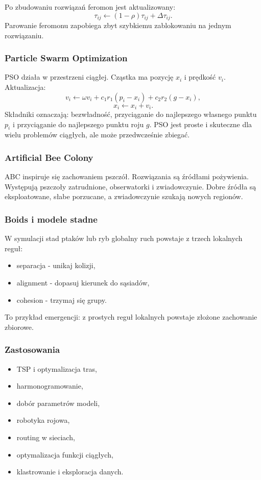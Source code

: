 Po zbudowaniu rozwiązań feromon jest aktualizowany:
\[
\tau_{ij}\leftarrow (1-\rho)\tau_{ij}+\Delta\tau_{ij}.
\]
Parowanie feromonu zapobiega zbyt szybkiemu zablokowaniu na jednym rozwiązaniu.

\subsubsection{Particle Swarm Optimization}

PSO działa w przestrzeni ciągłej. Cząstka ma pozycję $x_i$ i prędkość $v_i$. Aktualizacja:
\[
v_i\leftarrow \omega v_i+c_1r_1(p_i-x_i)+c_2r_2(g-x_i),
\]
\[
x_i\leftarrow x_i+v_i.
\]
Składniki oznaczają: bezwładność, przyciąganie do najlepszego własnego punktu $p_i$ i przyciąganie do najlepszego punktu roju $g$. PSO jest proste i skuteczne dla wielu problemów ciągłych, ale może przedwcześnie zbiegać.

\subsubsection{Artificial Bee Colony}

ABC inspiruje się zachowaniem pszczół. Rozwiązania są źródłami pożywienia. Występują pszczoły zatrudnione, obserwatorki i zwiadowczynie. Dobre źródła są eksploatowane, słabe porzucane, a zwiadowczynie szukają nowych regionów.

\subsubsection{Boids i modele stadne}

W symulacji stad ptaków lub ryb globalny ruch powstaje z trzech lokalnych reguł:
\begin{itemize}
  \item separacja - unikaj kolizji,
  \item alignment - dopasuj kierunek do sąsiadów,
  \item cohesion - trzymaj się grupy.
\end{itemize}
To przykład emergencji: z prostych reguł lokalnych powstaje złożone zachowanie zbiorowe.

\subsubsection{Zastosowania}

\begin{itemize}
  \item TSP i optymalizacja tras,
  \item harmonogramowanie,
  \item dobór parametrów modeli,
  \item robotyka rojowa,
  \item routing w sieciach,
  \item optymalizacja funkcji ciągłych,
  \item klastrowanie i eksploracja danych.
\end{itemize}

